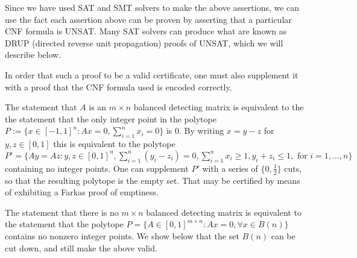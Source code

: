 \documentclass{article}
\begin{document}
Since we have used SAT and SMT solvers to make the above assertions,
we can use the fact each assertion above can be proven by asserting that a
particular CNF formula is UNSAT.  Many SAT solvers can produce what
are known as DRUP (directed reverse unit propagation) proofs of UNSAT,
which we will describe below.

In order that such a proof to be a valid certificate, one must also supplement
it with a proof that the CNF formula used is encoded correctly.

The statement that $A$ is an $m \times n$ balanced detecting matrix is
equivalent to the the statement that the only integer point in the
polytope $P := \{x \in [-1,1]^n : A x = 0,
\sum_{i=1}^n x_i = 0 \}$ is $0$.  By writing $x = y-z$ for $y,z \in
[0,1]$ this is equivalent to the
polytope $P' = \{A y = Az : y, z \in [0,1]^n, \sum_{i=1}^n (y_i - z_i)
= 0, \sum_{i=1}^n x_i \ge 1, y_i + z_i \le 1, \text{ for } i=1, \dots,
n\}$ containing no integer points.  One can supplement $P'$ with a series
of $\{0, \frac 1 2 \}$ cuts, so that the resulting polytope is the
empty set.  That may be certified by means of exhibiting a Farkas
proof of emptiness.

The statement that there is no $m \times n$ balanced detecting matrix
is equivalent to the statement that the polytope $P = \{A \in [0,1]^{m
  \times n} : A x = 0, \forall x \in B(n)\}$ contains no nonzero integer
points.  We show below that the set $B(n)$ can be cut down, and still
make the above valid.






\end{document}
